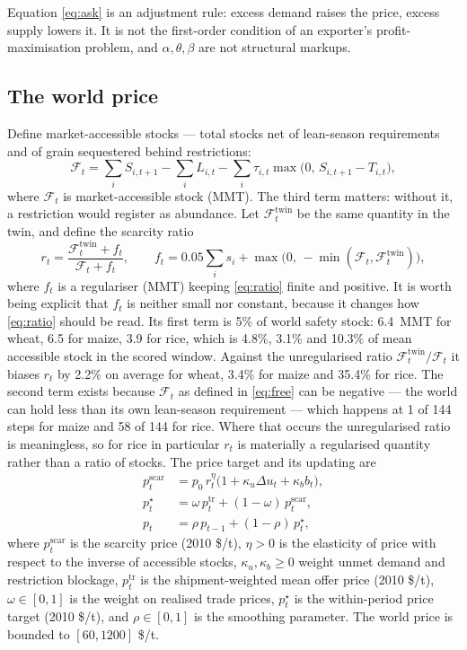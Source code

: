 Equation \eqref{eq:ask} is an adjustment rule: excess demand raises the
price, excess supply lowers it. It is not the first-order condition of an
exporter's profit-maximisation problem, and \(\alpha,\theta,\beta\) are
not structural markups.

\subsection{The world price}

Define market-accessible stocks --- total stocks net of lean-season
requirements and of grain sequestered behind restrictions:
\begin{equation}
\mathcal{F}_t=\sum_i S_{i,t+1}-\sum_i L_{i,t}
-\sum_i \tau_{i,t}\max\bigl(0,\,S_{i,t+1}-T_{i,t}\bigr),
\label{eq:free}
\end{equation}
where \(\mathcal{F}_t\) is market-accessible stock (MMT). The third term
matters: without it, a restriction would register as abundance. Let
\(\mathcal{F}^{\mathrm{twin}}_t\) be the same quantity in the twin, and
define the scarcity ratio
\begin{equation}
r_t=\frac{\mathcal{F}^{\mathrm{twin}}_t+f_t}{\mathcal{F}_t+f_t},
\qquad
f_t=0.05\sum_i s_i+\max\bigl(0,\,-\min(\mathcal{F}_t,\mathcal{F}^{\mathrm{twin}}_t)\bigr),
\label{eq:ratio}
\end{equation}
where \(f_t\) is a regulariser (MMT) keeping \eqref{eq:ratio} finite and
positive. It is worth being explicit that \(f_t\) is neither small nor
constant, because it changes how \eqref{eq:ratio} should be read. Its first
term is 5\% of world safety stock: 6.4~MMT for wheat, 6.5 for maize, 3.9
for rice, which is 4.8\%, 3.1\% and 10.3\% of mean accessible stock in the
scored window. Against the unregularised ratio
\(\mathcal{F}^{\mathrm{twin}}_t/\mathcal{F}_t\) it biases \(r_t\) by 2.2\%
on average for wheat, 3.4\% for maize and 35.4\% for rice. The second term
exists because \(\mathcal{F}_t\) as defined in \eqref{eq:free} can be
negative --- the world can hold less than its own lean-season requirement
--- which happens at 1 of 144 steps for maize and 58 of 144 for rice. Where
that occurs the unregularised ratio is meaningless, so for rice in
particular \(r_t\) is materially a regularised quantity rather than a ratio
of stocks. The price target and its updating are
\begin{align}
p^{\mathrm{scar}}_t&=p_0\,r_t^{\eta}\bigl(1+\kappa_u\Delta u_t+\kappa_b b_t\bigr),
\label{eq:pscar}\\[2pt]
p^{\star}_t&=\omega\,p^{\mathrm{tr}}_t+(1-\omega)\,p^{\mathrm{scar}}_t,
\label{eq:pstar}\\[2pt]
p_t&=\rho\,p_{t-1}+(1-\rho)\,p^{\star}_t,
\label{eq:pupdate}
\end{align}
where \(p^{\mathrm{scar}}_t\) is the scarcity price (2010 \$/t),
\(\eta>0\) is the elasticity of price with respect to the inverse of
accessible stocks, \(\kappa_u,\kappa_b\ge 0\) weight unmet demand and
restriction blockage, \(p^{\mathrm{tr}}_t\) is the shipment-weighted mean
offer price (2010 \$/t), \(\omega\in[0,1]\) is the weight on realised trade
prices, \(p^{\star}_t\) is the within-period price target (2010 \$/t), and
\(\rho\in[0,1]\) is the smoothing parameter. The world price is bounded to
\([60,1200]\) \$/t.

